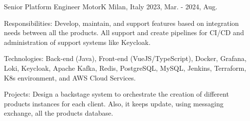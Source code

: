 

\begin{cventries}
  \cventry
    {Senior Platform Engineer} %
    {MotorK} %
    {Milan, Italy} %
    {2023, Mar. - 2024, Aug.} %
    {
      \begin{cvitems} %
        \item {Responsibilities: Develop, maintain, and support features based on integration needs between all the products. All support and create pipelines for CI/CD and administration of support systems like Keycloak.}
        \item {Technologies: Back-end (Java), Front-end (VueJS/TypeScript), Docker, Grafana, Loki, Keycloak, Apache Kafka, Redis, PostgreSQL, MySQL, Jenkins, Terraform, K8s environment, and AWS Cloud Services.}
        \item {Projects: Design a backstage system to orchestrate the creation of different products instances for each client. Also, it keeps update, using messaging exchange, all the products database.}
      \end{cvitems}
    }


\end{cventries}
